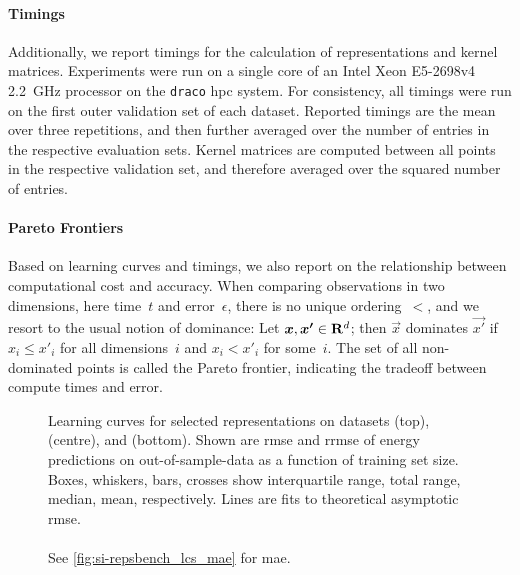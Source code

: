 %


\paragraph{Timings}
Additionally, we report timings for the calculation of representations and kernel matrices. Experiments were run on a single core of an Intel Xeon E5-2698v4 \SI{2.2}{\giga\hertz} processor on the \texttt{draco} \gls{hpc} system. For consistency, all timings were run on the first outer validation set of each dataset. Reported timings are the mean over three repetitions, and then further averaged over the number of entries in the respective evaluation sets. Kernel matrices are computed between all points in the respective validation set, and therefore averaged over the squared number of entries.

\paragraph{Pareto Frontiers}
Based on learning curves and timings, we also report on the relationship between computational cost and accuracy.
When comparing observations in two dimensions, here time~$t$ and error~$\epsilon$, there is no unique ordering~$<$,
and we resort to the usual notion of dominance:
Let $\boldsymbol{x}, \boldsymbol{x'} \in {\bf R}^d$;
then $\vec{x}$ dominates $\vec{x'}$ if $x_i \leq x'_i$ for all dimensions~$i$ and $x_i < x'_i$ for some~$i$.
The set of all non-dominated points is called the Pareto frontier, indicating the  tradeoff between compute times and error.


\begin{figure}
  \centering



  \caption{Learning curves for selected representations on datasets \dsgdb{} (top), \dsba{} (centre), and \dstcor{} (bottom).
		Shown are \gls{rmse} and \gls{rrmse} of energy predictions on out-of-sample-data as a function of training set size.
		Boxes, whiskers, bars, crosses show interquartile range, total range, median, mean, respectively.
		Lines are fits to theoretical asymptotic \gls{rmse}.
		\\\\
		See \cref{fig:si-repsbench_lcs_mae} for \gls{mae}.
	}
	\label{fig:repsbench-lcs}
\end{figure}


